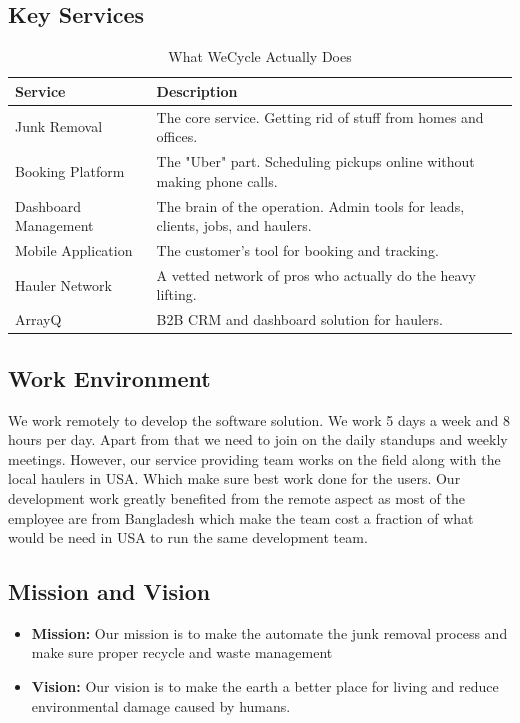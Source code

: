 \subsection{Key Services}
\begin{table}[H]
\centering
\caption{What WeCycle Actually Does}
\begin{tabular}{|l|p{10cm}|}
\hline
\textbf{Service} & \textbf{Description} \\
\hline
Junk Removal & The core service. Getting rid of stuff from homes and offices. \\
\hline
Booking Platform & The "Uber" part. Scheduling pickups online without making phone calls. \\
\hline
Dashboard Management & The brain of the operation. Admin tools for leads, clients, jobs, and haulers. \\
\hline
Mobile Application & The customer's tool for booking and tracking. \\
\hline
Hauler Network \cite{wecyclehauler2024} & A vetted network of pros who actually do the heavy lifting. \\
\hline
ArrayQ & B2B CRM and dashboard solution for haulers. \\
\hline
\end{tabular}
\label{tab:services}
\end{table}

\subsection{Work Environment}
\par We work remotely to develop the software solution. We work 5 days a week and 8 hours per day. Apart from that we need to join on the daily standups and weekly meetings. However, our service providing team works on the field along with the local haulers in USA. Which make sure best work done for the users. Our development work greatly benefited from the remote aspect as most of the employee are from Bangladesh which make the team cost a fraction of what would be need in USA to run the same development team.

\subsection{Mission and Vision}
\begin{itemize}
    \item \textbf{Mission:} Our mission is to make the automate the junk removal process and make sure proper recycle and waste management
    \item \textbf{Vision:} Our vision is to make the earth a better place for living and reduce environmental damage caused by humans.
\end{itemize}

